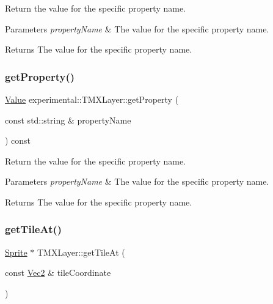 Return the value for the specific property name.


\begin{DoxyParams}{Parameters}
{\em property\+Name} & The value for the specific property name. \\
\hline
\end{DoxyParams}
\begin{DoxyReturn}{Returns}
The value for the specific property name. 
\end{DoxyReturn}
\mbox{\label{classexperimental_1_1TMXLayer_a1400878c7f3ac3c4a2b59e56e5c9cc0a}} 
\subsubsection{\texorpdfstring{get\+Property()}{getProperty()}\hspace{0.1cm}{\footnotesize\ttfamily [2/2]}}
{\footnotesize\ttfamily \hyperlink{classValue}{Value} experimental\+::\+T\+M\+X\+Layer\+::get\+Property (\begin{DoxyParamCaption}\item[{const std\+::string \&}]{property\+Name }\end{DoxyParamCaption}) const}

Return the value for the specific property name.


\begin{DoxyParams}{Parameters}
{\em property\+Name} & The value for the specific property name. \\
\hline
\end{DoxyParams}
\begin{DoxyReturn}{Returns}
The value for the specific property name. 
\end{DoxyReturn}
\mbox{\label{classexperimental_1_1TMXLayer_a3766adcc9f0d3619c97620b7e1cf04dc}} 
\subsubsection{\texorpdfstring{get\+Tile\+At()}{getTileAt()}\hspace{0.1cm}{\footnotesize\ttfamily [1/2]}}
{\footnotesize\ttfamily \hyperlink{classSprite}{Sprite} $\ast$ T\+M\+X\+Layer\+::get\+Tile\+At (\begin{DoxyParamCaption}\item[{const \hyperlink{classVec2}{Vec2} \&}]{tile\+Coordinate }\end{DoxyParamCaption})}

